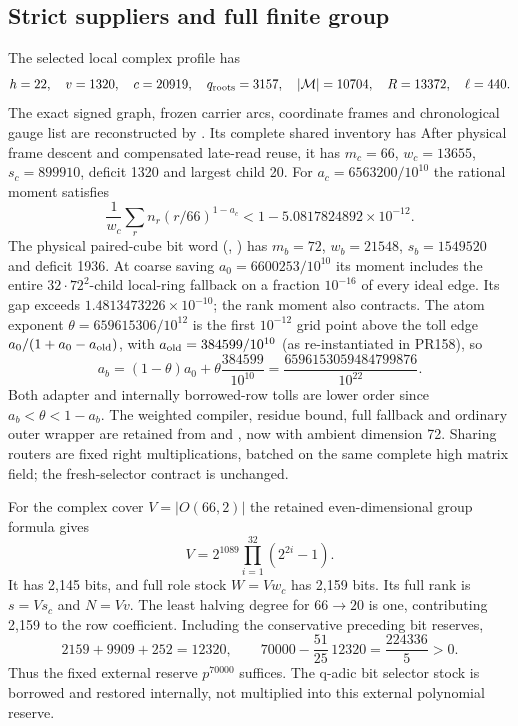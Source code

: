 \subsection{Strict suppliers and full finite group}
The selected local complex profile has
\[
 h=22,\quad v=1320,\quad c=20919,\quad q_{\rm roots}=3157,
 \quad |\mathcal M|=10704,\quad R=13372,\quad\ell=440.
\]
The exact signed graph, frozen carrier arcs, coordinate frames and
chronological gauge list are reconstructed by
. Its complete shared inventory has
After physical frame descent and compensated late-read reuse, it has
$m_c=66$, $w_c=13655$, $s_c=899910$, deficit 1320 and largest child 20.
For $a_c=6563200/10^{10}$ the rational moment satisfies
\[
 \frac1{w_c}\sum_r n_r(r/66)^{1-a_c}
 <1-5.0817824892\times10^{-12}.
\]
The physical paired-cube bit word (,
) has $m_b=72$,
$w_b=21548$, $s_b=1549520$ and deficit 1936.
At coarse saving $a_0=6600253/10^{10}$ its moment includes the entire
$32\cdot72^2$-child local-ring fallback on a fraction $10^{-16}$ of every
ideal edge. Its gap exceeds $1.4813473226\times10^{-10}$; the rank moment
also contracts. The atom exponent $\theta=659615306/10^{12}$ is the first
$10^{-12}$ grid point above the toll edge $a_0/(1+a_0-a_{\rm old})$, with
$a_{\rm old}=384599/10^{10}$ (as re-instantiated in PR158), so
\[
 a_b=(1-\theta)a_0+\theta\frac{384599}{10^{10}}
     =\frac{6596153059484799876}{10^{22}}.
\]
Both adapter and internally borrowed-row tolls are lower order since
$a_b<\theta<1-a_b$. The weighted compiler, residue bound, full fallback
and ordinary outer wrapper are retained from
 and
, now with ambient dimension 72.
Sharing routers are fixed right multiplications, batched on the same
complete high matrix field; the fresh-selector contract is unchanged.

For the complex cover $V=|O(66,2)|$ the retained even-dimensional group
formula gives
\[
 V=2^{1089}\prod_{i=1}^{32}(2^{2i}-1).
\]
It has 2,145 bits, and full role stock $W=Vw_c$ has 2,159 bits.
Its full rank is $s=Vs_c$ and $N=Vv$.
The least halving degree for $66\to20$ is one, contributing 2,159 to
the row coefficient. Including the conservative preceding bit reserves,
\[
 2159+9909+252=12320,\qquad
 70000-\frac{51}{25}\,12320=\frac{224336}{5}>0.
\]
Thus the fixed external reserve $p^{70000}$ suffices. The q-adic bit
selector stock is borrowed and restored internally, not multiplied into
this external polynomial reserve.

